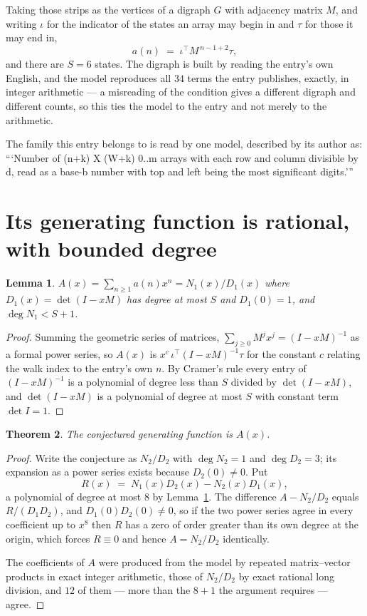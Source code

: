 \documentclass[11pt,a4paper]{article}
\theoremstyle{plain}
\newtheorem{theorem}{Theorem}
\newtheorem{lemma}[theorem]{Lemma}
\theoremstyle{definition}
\begin{document}
Taking those strips as the vertices of a digraph $G$ with adjacency matrix $M$, and writing
$\iota$ for the indicator of the states an array may begin in and $\tau$ for those it may end
in,
\[
a(n)\;=\;\iota^{\!\top}M^{\,n-1+2}\tau ,
\]
and there are $S=6$ states. The digraph is built by reading the entry's own English, and the
model reproduces all $34$ terms the entry publishes, exactly, in integer arithmetic --- a
misreading of the condition gives a different digraph and different counts, so this ties the
model to the entry and not merely to the arithmetic.

The family this entry belongs to is read by one model, described by its author as: ```Number of (n+k) X (W+k) 0..m arrays with each row and column divisible by d, read as a base-b number with top and left being the most significant digits.'''


\section{Its generating function is rational, with bounded degree}

\begin{lemma}\label{lem:rat}
$A(x)=\sum_{n\ge1}a(n)x^n=N_1(x)/D_1(x)$ where $D_1(x)=\det(I-xM)$ has degree at most
$S$ and $D_1(0)=1$, and $\deg N_1<S+1$.
\end{lemma}

\begin{proof}
Summing the geometric series of matrices, $\sum_{j\ge0}M^jx^j=(I-xM)^{-1}$ as a formal
power series, so $A(x)$ is $x^{c}\,\iota^{\!\top}(I-xM)^{-1}\tau$ for the constant $c$
relating the walk index to the entry's own $n$. By Cramer's rule every entry of
$(I-xM)^{-1}$ is a polynomial of degree less than $S$ divided by $\det(I-xM)$, and
$\det(I-xM)$ is a polynomial of degree at most $S$ with constant term $\det I=1$.
\end{proof}

\begin{theorem}
The conjectured generating function is $A(x)$.
\end{theorem}

\begin{proof}
Write the conjecture as $N_2/D_2$ with $\deg N_2=1$ and $\deg D_2=3$; its expansion as a
power series exists because $D_2(0)\neq0$. Put
\[
R(x)\;=\;N_1(x)D_2(x)-N_2(x)D_1(x),
\]
a polynomial of degree at most $8$ by Lemma~\ref{lem:rat}. The difference
$A-N_2/D_2$ equals $R/(D_1D_2)$, and $D_1(0)D_2(0)\neq0$, so if the two power series agree in
every coefficient up to $x^{8}$ then $R$ has a zero of order greater than its own
degree at the origin, which forces $R\equiv0$ and hence $A=N_2/D_2$ identically.

The coefficients of $A$ were produced from the model by repeated matrix--vector products in
exact integer arithmetic, those of $N_2/D_2$ by exact rational long division, and $12$
of them --- more than the $8+1$ the argument requires --- agree.
\end{proof}
\end{document}
